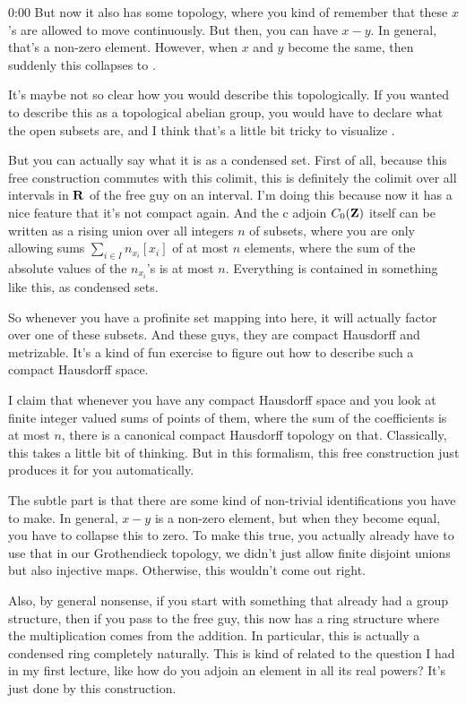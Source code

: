 \begin{unfinished}{0:00}
But now it also has some topology, where you kind of remember that these $x$'s are allowed to move continuously. But then, you can have $x - y$. In general, that's a non-zero element. However, when $x$ and $y$ become the same, then suddenly this collapses to .

It's maybe not so clear how you would describe this topologically. If you wanted to describe this as a topological abelian group, you would have to declare what the open subsets are, and I think that's a little bit tricky to visualize .

But you can actually say what it is as a condensed set. First of all, because this free construction commutes with this colimit, this is definitely the colimit over all intervals in $\mathbf R$ of the free guy on an interval.
I'm doing this because now it has a nice feature that it's not compact again. And the c adjoin $C_0(\mathbf Z)$ itself can be written as a rising union over all integers $n$ of subsets, where you are only allowing sums $\sum_{i\in I} n_{x_i}[x_i]$ of at most $n$ elements, where the sum of the absolute values of the $n_{x_i}$'s is at most $n$. Everything is contained in something like this, as condensed sets.

So whenever you have a profinite set mapping into here, it will actually factor over one of these subsets. And these guys, they are compact Hausdorff and metrizable. 
It's a kind of fun exercise to figure out how to describe such a compact Hausdorff space.

I claim that whenever you have any compact Hausdorff space and you look at finite integer valued sums of points of them, where the sum of the coefficients is at most $n$, there is a canonical compact Hausdorff topology on that. Classically, this takes a little bit of thinking. But in this formalism, this free construction just produces it for you automatically.

The subtle part is that there are some kind of non-trivial identifications you have to make. In general, $x-y$ is a non-zero element, but when they become equal, you have to collapse this to zero. To make this true, you actually already have to use that in our Grothendieck topology, we didn't just allow finite disjoint unions but also injective maps. Otherwise, this wouldn't come out right.

Also, by general nonsense, if you start with something that already had a group structure, then if you pass to the free guy, this now has a ring structure where the multiplication comes from the addition. In particular, this is actually a condensed ring completely naturally. This is kind of related to the question I had in my first lecture, like how do you adjoin an element in all its real powers? It's just done by this construction.


\end{unfinished}
